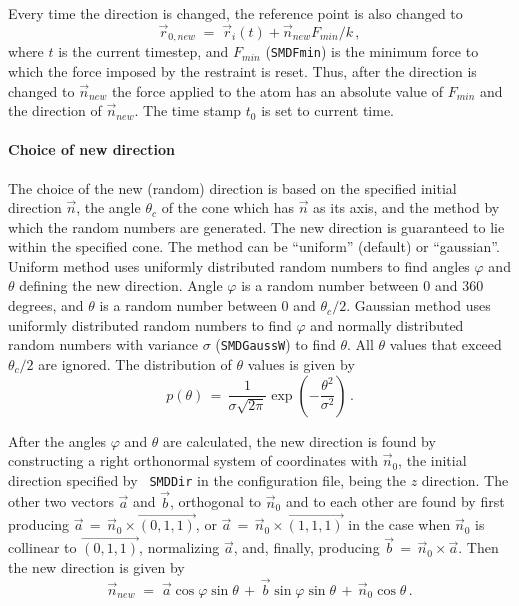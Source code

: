 Every time the direction is changed, the reference point is also
changed to
\begin{equation}
  \vec r_{0,new} \; = \; \vec r_i(t) + \vec n_{new} F_{min}/k \, ,
\label{eq:smdreset}
\end{equation}
where $t$ is the current timestep, and $F_{min}$ ({\tt SMDFmin}) is
the minimum force to which the force imposed by the restraint is
reset. Thus, after the direction is changed to $\vec n_{new}$ the
force applied to the atom has an absolute value of $F_{min}$ and the
direction of $\vec n_{new}$. The time stamp $t_0$ is set to current
time.


\paragraph{Choice of new direction}
The choice of the new (random) direction is based on the specified
initial direction $\vec n$, the angle $\theta_c$ of the cone which has
$\vec n$ as its axis, and the method by which the random numbers are
generated.  The new direction is guaranteed to lie within the
specified cone. The method can be ``uniform'' (default) or
``gaussian''. Uniform method uses uniformly distributed random numbers
to find angles $\varphi$ and $\theta$ defining the new
direction. Angle $\varphi$ is a random number between 0 and 360
degrees, and $\theta$ is a random number between 0 and
$\theta_c/2$. Gaussian method uses uniformly distributed random
numbers to find $\varphi$ and normally distributed random numbers with
variance $\sigma$ ({\tt SMDGaussW}) to find $\theta$. All $\theta$
values that exceed $\theta_c/2$ are ignored. The distribution of
$\theta$ values is given by 
\begin{equation}
p(\theta) \, = \, \frac{1}{\sigma \sqrt{2\pi}} 
\exp(- \frac{\theta^2}{\sigma^2}) \, .
\end{equation}

After the angles $\varphi$ and $\theta$ are calculated, the new
direction is found by constructing a right orthonormal system of
coordinates with $\vec n_0$, the initial direction specified by {\tt
SMDDir} in the configuration file, being the $z$ direction.  The
other two vectors $\vec a$ and $\vec b$, orthogonal to $\vec n_0$ and
to each other are found by first producing $\vec a \, = \, \vec n_0
\times
\vec{(0, 1, 1)}$, or $\vec a \, = \, \vec n_0 \times 
\vec{(1, 1, 1)}$ in the case when $\vec n_0$ is collinear to 
$\vec{(0, 1, 1)}$, normalizing $\vec a$, and, finally, producing 
$\vec b \, = \, \vec n_0 \times \vec a$. Then the new direction is
given by 
\begin{equation}
\vec n_{new} \; = \; \vec a \cos\varphi \sin\theta \, + \,
	\vec b \sin\varphi \sin\theta \, + \,
	\vec n_0 \cos\theta \, .
\end{equation}


